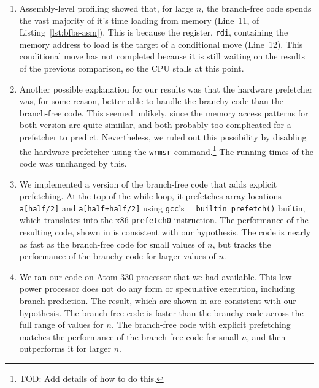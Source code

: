 \documentclass{patmorin}
\newcommand{\lstref}[1]{Listing~\ref{lst:#1}}
\begin{document}
\begin{enumerate}
\item Assembly-level profiling showed that, for large $n$, the
  branch-free code spends the vast majority of it's time loading from
  memory (Line~11, of \lstref{bfbs-asm}).  This is because the register,
  \texttt{rdi},  containing the memory address to load is the
  target of a conditional move (Line~12).  This conditional move has not
  completed because it is still waiting on the results of the previous
  comparison, so the CPU stalls at this point.

\item Another possible explanation for our results was that the hardware
   prefetcher was, for some reason, better able to handle the branchy
   code than the branch-free code.  This seemed unlikely, since the
   memory access patterns for both version are quite simiilar, and both
   probably too complicated for a prefetcher to predict. Nevertheless,
   we ruled out this possibility by disabling the hardware prefetcher
   using the \texttt{wrmsr} command.\footnote{TOD: Add details of
   how to do this.}  The running-times of the code was unchanged by this.

\item We implemented a version of the branch-free code that adds explicit
   prefetching. At the top of the while loop, it
   prefetches array locations \texttt{a[half/2]}
   and \texttt{a[half+half/2]} using \texttt{gcc}'s
   \texttt{__builtin_prefetch()} builtin, which translates into
   the x86 \texttt{prefetch0} instruction.  The performance of
   the resulting code, shown in  is consistent with
   our hypothesis.  The code is nearly as fast as the branch-free code
   for small values of $n$, but tracks the performance of the branchy
   code for larger values of $n$.

\item We ran our code on Atom 330 processor that we had available.  This
   low-power processor does not do any form or speculative
   execution, including branch-prediction.  The result, which are
   shown in  are consistent with our hypothesis.
   The branch-free code is faster than the branchy code across the full
   range of values for $n$. The branch-free code with explicit prefetching
   matches the performance of the branch-free code for small $n$, and
   then outperforms it for larger $n$.
\end{enumerate}
\end{document}
